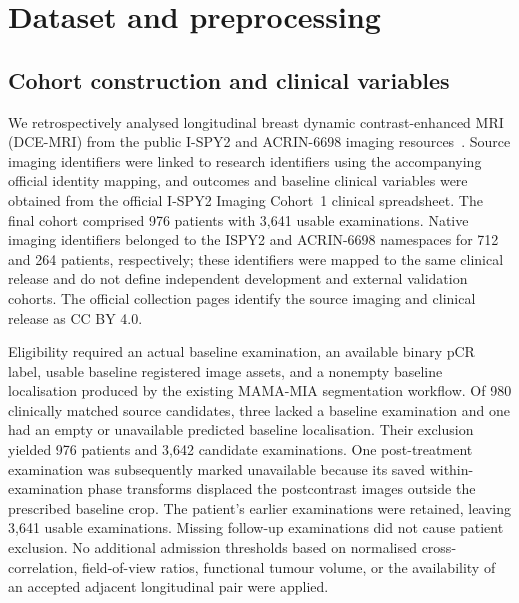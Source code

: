 \section{Dataset and preprocessing}
\label{sec:data}

\subsection{Cohort construction and clinical variables}
We retrospectively analysed longitudinal breast dynamic contrast-enhanced MRI
(DCE-MRI) from the public I-SPY2 and ACRIN-6698 imaging
resources~\cite{tciaispy2_2022,tciaacrin6698_2021}. Source imaging identifiers
were linked to research identifiers using the accompanying official identity
mapping, and outcomes and baseline clinical variables were obtained from the
official I-SPY2 Imaging Cohort~1 clinical spreadsheet. The final cohort
comprised 976 patients with 3,641 usable examinations. Native imaging
identifiers belonged to the ISPY2 and ACRIN-6698 namespaces for 712 and 264
patients, respectively; these identifiers were mapped to the same clinical
release and do not define independent development and external validation
cohorts. The official collection pages identify the source imaging and clinical
release as CC BY 4.0. 

Eligibility required an actual baseline examination, an available binary pCR
label, usable baseline registered image assets, and a nonempty baseline
localisation produced by the existing MAMA-MIA segmentation workflow. Of 980
clinically matched source candidates, three lacked a baseline examination and
one had an empty or unavailable predicted baseline localisation. Their
exclusion yielded 976 patients and 3,642 candidate examinations. One
post-treatment examination was subsequently marked unavailable because its
saved within-examination phase transforms displaced the postcontrast images
outside the prescribed baseline crop. The patient's earlier examinations were
retained, leaving 3,641 usable examinations. Missing follow-up examinations did
not cause patient exclusion. No additional admission thresholds based on
normalised cross-correlation, field-of-view ratios, functional tumour volume,
or the availability of an accepted adjacent longitudinal pair were applied.

